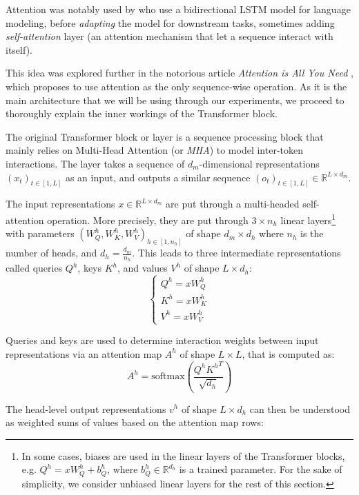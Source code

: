 Attention was notably used by \citet{peters-etal-2018-deep} who use a bidirectional LSTM model for language modeling, before \textit{adapting} the model for downstream tasks, sometimes adding \textit{self-attention} layer (an attention mechanism that let a sequence interact with itself).

This idea was explored further in the notorious article \textit{Attention is All You Need} \citep{vaswani2017attention}, which proposes to use attention as the only sequence-wise operation. As it is the main architecture that we will be using through our experiments, we proceed to thoroughly explain the inner workings of the Transformer block.

The original Transformer block or layer is a sequence processing block that mainly relies on Multi-Head Attention (or \textit{MHA}) to model inter-token interactions. The layer takes a sequence of $d_m$-dimensional representations $(x_t)_{t \in [1, L]}$ as an input, and outputs a similar sequence $(o_t)_{t \in [1, L]} \in \mathbb{R}^{L \times d_m}$. 

The input representations $x \in \mathbb{R}^{L \times d_m}$ are put through a multi-headed self-attention operation. More precisely, they are put through $3 \times n_h$ linear layers\footnote{In some cases, biases are used in the linear layers of the Transformer blocks, e.g. $Q^h = x W_Q^h + b_Q^h$, where $b_Q^h \in \mathbb{R}^{d_h}$ is a trained parameter. For the sake of simplicity, we consider unbiased linear layers for the rest of this section.} with parameters $(W_Q^h, W_K^h, W_V^h)_{h \in [1, n_h]}$ of shape $d_m \times d_h$ where $n_h$ is the number of heads, and $d_h = \frac{d_m}{n_h}$. This leads to three intermediate representations called queries $Q^h$, keys $K^h$, and values $V^h$ of shape $L \times d_h$:
\begin{equation*}
    \begin{cases}
        Q^h = x W_Q^h \\
        K^h = x W_K^h \\
        V^h = x W_V^h
    \end{cases}
\end{equation*}

Queries and keys are used to determine interaction weights between input representations via an attention map $A^h$ of shape $L \times L$, that is computed as:
$$
A^h = \text{softmax} \left(\frac{Q^h {K^h}^T}{\sqrt{d_h}}\right)
$$

The head-level output representations $v^h$ of shape $L \times d_h$ can then be understood as weighted sums of values based on the attention map rows:

